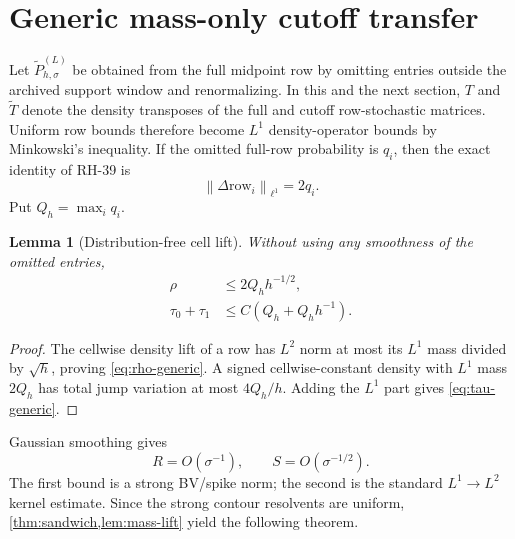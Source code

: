 \documentclass[11pt]{article}
\newtheorem{lemma}[theorem]{Lemma}
\theoremstyle{remark}
\newcommand{\norm}[1]{\left\lVert #1\right\rVert}
\begin{document}
\section{Generic mass-only cutoff transfer}

Let $\widetilde P_{h,\sigma}^{(L)}$ be obtained from the full midpoint row
by omitting entries outside the archived support window and renormalizing.
In this and the next section, $T$ and $\widetilde T$ denote the density
transposes of the full and cutoff row-stochastic matrices.  Uniform row
bounds therefore become $L^1$ density-operator bounds by Minkowski's
inequality.
If the omitted full-row probability is $q_i$, then the exact identity of
RH-39 is
\begin{equation}
 \norm{\Delta\mathrm{row}_i}_{\ell^1}=2q_i.
 \label{eq:twice-tail}
\end{equation}
Put $Q_h=\max_iq_i$.

\begin{lemma}[Distribution-free cell lift]
\label{lem:mass-lift}
Without using any smoothness of the omitted entries,
\begin{align}
 \rho&\le2Q_hh^{-1/2},
 \label{eq:rho-generic}\\
 \tau_0+\tau_1&\le C(Q_h+Q_hh^{-1}).
 \label{eq:tau-generic}
\end{align}
\end{lemma}

\begin{proof}
The cellwise density lift of a row has $L^2$ norm at most its $L^1$ mass
divided by $\sqrt h$, proving \eqref{eq:rho-generic}.  A signed
cellwise-constant density with $L^1$ mass $2Q_h$ has total jump variation at
most $4Q_h/h$.  Adding the $L^1$ part gives \eqref{eq:tau-generic}.
\end{proof}

Gaussian smoothing gives
\begin{equation}
 R=O(\sigma^{-1}),
 \qquad
 S=O(\sigma^{-1/2}).
 \label{eq:smoothing-coarse}
\end{equation}
The first bound is a strong BV/spike norm; the second is the standard
$L^1\to L^2$ kernel estimate.  Since the strong contour resolvents are
uniform, \cref{thm:sandwich,lem:mass-lift} yield the following theorem.
\end{document}
